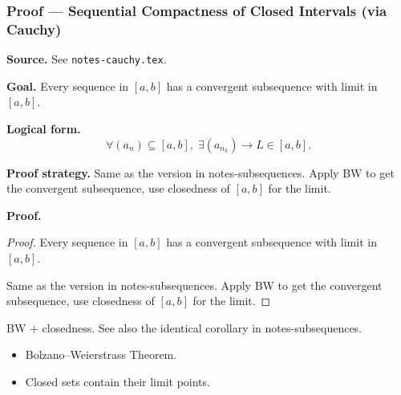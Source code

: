 
\clearpage
{}
\hypertarget{proof-RA-ABB-C-seq-compact-cauchy}{}

\subsubsection[Sequential Compactness of Closed Intervals (via Cauchy)]{Proof --- Sequential Compactness of Closed Intervals (via Cauchy)}

\bigskip

\noindent
\textbf{Source.}
See \texttt{notes-cauchy.tex}.

\vspace{0.75em}

\noindent
\textbf{Goal.}
Every sequence in $[a,b]$ has a convergent subsequence with limit in $[a,b]$.

\vspace{0.75em}

\noindent
\textbf{Logical form.}
\[
  \forall (a_n) \subseteq [a,b],\; \exists (a_{n_k}) \to L \in [a,b].
\]

\vspace{0.75em}

\noindent
\textbf{Proof strategy.}
Same as the version in notes-subsequences. Apply BW to get the convergent subsequence, use closedness of $[a,b]$ for the limit.

\vspace{0.75em}

\noindent
\textbf{Proof.}
\begin{proof}
\Claim Every sequence in $[a,b]$ has a convergent subsequence with limit in $[a,b]$.

\Given 

\Goal 

\Strategy Same as the version in notes-subsequences. Apply BW to get the convergent subsequence, use closedness of $[a,b]$ for the limit.

\medskip


\end{proof}

\begin{remark*}
BW $+$ closedness. See also the identical corollary in notes-subsequences.
\end{remark*}

\begin{remark*}[Dependencies]
\begin{itemize}
  \item Bolzano--Weierstrass Theorem.
  \item Closed sets contain their limit points.
\end{itemize}
\end{remark*}
